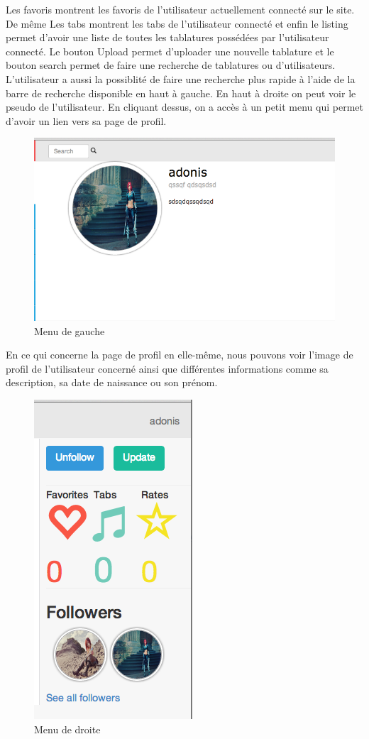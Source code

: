 Les favoris montrent les favoris de l'utilisateur actuellement connecté sur le site. De même Les tabs montrent les tabs de l'utilisateur connecté et enfin le listing permet d'avoir une liste de toutes les tablatures possédées par l'utilisateur connecté. Le bouton Upload permet d'uploader une nouvelle tablature et le bouton search permet de faire une recherche de tablatures ou d'utilisateurs. L'utilisateur a aussi la possiblité de faire une recherche plus rapide à l'aide de la barre de recherche disponible en haut à gauche. En haut à droite on peut voir le pseudo de l'utilisateur. En cliquant dessus, on a accès à un petit menu qui permet d'avoir un lien vers sa page de profil. \\

\begin{figure}[H]
\centering
\includegraphics[scale=0.5]{centerWEB}
\caption{Menu de gauche}
\end{figure}

En ce qui concerne la page de profil en elle-même, nous pouvons voir l'image de profil de l'utilisateur concerné ainsi que différentes informations comme sa description, sa date de naissance ou son prénom. \\

\begin{figure}[H]
\centering
\includegraphics[scale=0.5]{rightWEB}
\caption{Menu de droite}
\end{figure}

